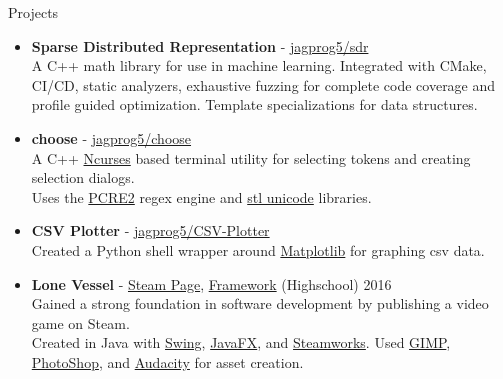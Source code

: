 \documentclass{resume} %
\begin{document}
\begin{rSection}{Projects}
\begin{itemize}
    \item {\bf Sparse Distributed Representation} - \href{https://github.com/jagprog5/SDR/}{jagprog5/sdr}\\
    A C++ math library for use in machine learning. Integrated with CMake, CI/CD, static analyzers, exhaustive fuzzing for complete code coverage and profile guided optimization. Template specializations for data structures.
    \item {\bf choose} - \href{https://github.com/jagprog5/choose/}{jagprog5/choose}\\
    A C++ \href{https://en.wikipedia.org/wiki/Ncurses}{Ncurses} based terminal utility for selecting tokens and creating selection dialogs.\\
    Uses the \href{https://www.pcre.org/current/doc/html/}{PCRE2} regex engine and \href{https://en.cppreference.com/w/cpp/header/cwchar}{stl unicode} libraries.
    \item {\bf CSV Plotter} - \href{https://github.com/jagprog5/CSV-Plotter}{jagprog5/CSV-Plotter}\\
    Created a Python shell wrapper around \href{https://matplotlib.org/}{Matplotlib} for graphing csv data. 
    \item {\bf Lone Vessel} - \href{https://store.steampowered.com/app/687420/Lone_Vessel/}{Steam Page}, \href{https://www.youtube.com/watch?v=X63V_5YDLC0}{Framework}
    \hfill {(Highschool) 2016}\\
    Gained a strong foundation in software development by publishing a video game on Steam.\\
    Created in Java with \href{https://www.javatpoint.com/java-swing}{Swing}, \href{https://openjfx.io/}{JavaFX}, and \href{https://partner.steamgames.com/doc/api}{Steamworks}.
    Used \href{https://www.gimp.org/}{GIMP}, \href{https://www.adobe.com/ca/products/photoshop.html}{PhotoShop}, and \href{https://www.audacityteam.org/}{Audacity} for asset creation. 
\end{itemize}


\end{rSection}
\end{document}
